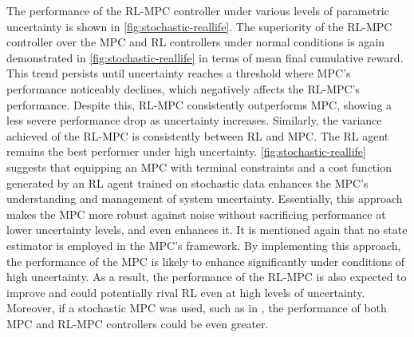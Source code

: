 The performance of the RL-MPC controller under various levels of parametric uncertainty is shown in \autoref{fig:stochastic-reallife}. The superiority of the RL-MPC controller over the MPC and RL controllers under normal conditions is again demonstrated in \autoref{fig:stochastic-reallife} in terms of mean final cumulative reward. This trend persists until uncertainty reaches a threshold where MPC's performance noticeably declines, which negatively affects the RL-MPC's performance. Despite this, RL-MPC consistently outperforms MPC, showing a less severe performance drop as uncertainty increases. Similarly, the variance achieved of the RL-MPC is consistently between RL and MPC. The RL agent remains the best performer under high uncertainty. \autoref{fig:stochastic-reallife} suggests that equipping an MPC with terminal constraints and a cost function generated by an RL agent trained on stochastic data enhances the MPC's understanding and management of system uncertainty. Essentially, this approach makes the MPC more robust against noise without sacrificing performance at lower uncertainty levels, and even enhances it. It is mentioned again that no state estimator is employed in the MPC's framework. By implementing this approach, the performance of the MPC is likely to enhance significantly under conditions of high uncertainty. As a result, the performance of the RL-MPC is also expected to improve and could potentially rival RL even at high levels of uncertainty. Moreover, if a stochastic MPC was used, such as in \citet{boersmaRobustSamplebasedModel2022}, the performance of both MPC and RL-MPC controllers could be even greater. 



